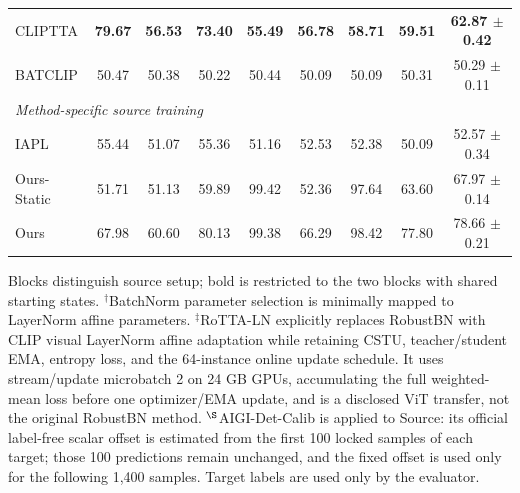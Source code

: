 \begin{table}[t]
{\begin{tabular}{lcccccccc}
CLIPTTA & \textbf{79.67} & \textbf{56.53} & \textbf{73.40} & \textbf{55.49} & \textbf{56.78} & \textbf{58.71} & \textbf{59.51} & \textbf{62.87 $\pm$ 0.42} \\
BATCLIP & 50.47 & 50.38 & 50.22 & 50.44 & 50.09 & 50.09 & 50.31 & 50.29 $\pm$ 0.11 \\
\midrule
\multicolumn{9}{l}{\textit{Method-specific source training}} \\
IAPL & 55.44 & 51.07 & 55.36 & 51.16 & 52.53 & 52.38 & 50.09 & 52.57 $\pm$ 0.34 \\
Ours-Static & 51.71 & 51.13 & 59.89 & 99.42 & 52.36 & 97.64 & 63.60 & 67.97 $\pm$ 0.14 \\
Ours & 67.98 & 60.60 & 80.13 & 99.38 & 66.29 & 98.42 & 77.80 & 78.66 $\pm$ 0.21 \\
\bottomrule
\end{tabular}%
}
\vspace{2pt}
\parbox{\textwidth}{\footnotesize Blocks distinguish source setup; bold is restricted to the two blocks with shared starting states. $^{\dagger}$BatchNorm parameter selection is minimally mapped to LayerNorm affine parameters. $^{\ddagger}$RoTTA-LN explicitly replaces RobustBN with CLIP visual LayerNorm affine adaptation while retaining CSTU, teacher/student EMA, entropy loss, and the 64-instance online update schedule. It uses stream/update microbatch 2 on 24 GB GPUs, accumulating the full weighted-mean loss before one optimizer/EMA update, and is a disclosed ViT transfer, not the original RobustBN method. $^{\S}$AIGI-Det-Calib is applied to Source: its official label-free scalar offset is estimated from the first 100 locked samples of each target; those 100 predictions remain unchanged, and the fixed offset is used only for the following 1,400 samples. Target labels are used only by the evaluator.}
\end{table}
